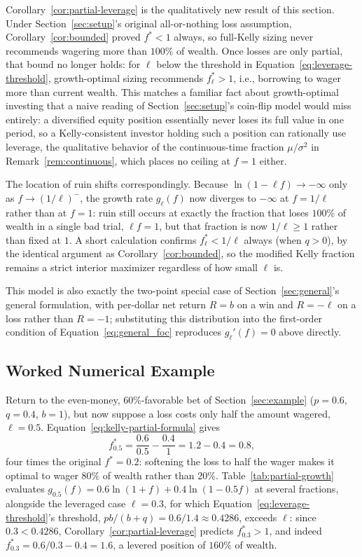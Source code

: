 \documentclass[11pt]{article}
\theoremstyle{remark}
\theoremstyle{definition}
\begin{document}
Corollary~\ref{cor:partial-leverage} is the qualitatively new result of this section. Under Section~\ref{sec:setup}'s original all-or-nothing loss assumption, Corollary~\ref{cor:bounded} proved $f^{*}<1$ always, so full-Kelly sizing never recommends wagering more than $100\%$ of wealth. Once losses are only partial, that bound no longer holds: for $\ell$ below the threshold in Equation~\eqref{eq:leverage-threshold}, growth-optimal sizing recommends $f_\ell^{*}>1$, i.e., borrowing to wager more than current wealth. This matches a familiar fact about growth-optimal investing that a naive reading of Section~\ref{sec:setup}'s coin-flip model would miss entirely: a diversified equity position essentially never loses its full value in one period, so a Kelly-consistent investor holding such a position can rationally use leverage, the qualitative behavior of the continuous-time fraction $\mu/\sigma^2$ in Remark~\ref{rem:continuous}, which places no ceiling at $f=1$ either.

The location of ruin shifts correspondingly. Because $\ln(1-\ell f)\to-\infty$ only as $f\to (1/\ell)^{-}$, the growth rate $g_\ell(f)$ now diverges to $-\infty$ at $f=1/\ell$ rather than at $f=1$: ruin still occurs at exactly the fraction that loses $100\%$ of wealth in a single bad trial, $\ell f=1$, but that fraction is now $1/\ell\ge 1$ rather than fixed at $1$. A short calculation confirms $f_\ell^{*}<1/\ell$ always (when $q>0$), by the identical argument as Corollary~\ref{cor:bounded}, so the modified Kelly fraction remains a strict interior maximizer regardless of how small $\ell$ is.

This model is also exactly the two-point special case of Section~\ref{sec:general}'s general formulation, with per-dollar net return $R=b$ on a win and $R=-\ell$ on a loss rather than $R=-1$; substituting this distribution into the first-order condition of Equation~\eqref{eq:general_foc} reproduces $g_\ell'(f)=0$ above directly.

\subsection{Worked Numerical Example}
\label{sec:partial-example}

Return to the even-money, $60\%$-favorable bet of Section~\ref{sec:example} ($p=0.6$, $q=0.4$, $b=1$), but now suppose a loss costs only half the amount wagered, $\ell=0.5$. Equation~\eqref{eq:kelly-partial-formula} gives
\begin{equation*}
f_{0.5}^{*} = \frac{0.6}{0.5} - \frac{0.4}{1} = 1.2 - 0.4 = 0.8,
\end{equation*}
four times the original $f^{*}=0.2$: softening the loss to half the wager makes it optimal to wager $80\%$ of wealth rather than $20\%$. Table~\ref{tab:partial-growth} evaluates $g_{0.5}(f) = 0.6\ln(1+f) + 0.4\ln(1-0.5f)$ at several fractions, alongside the leveraged case $\ell=0.3$, for which Equation~\eqref{eq:leverage-threshold}'s threshold, $pb/(b+q) = 0.6/1.4 \approx 0.4286$, exceeds $\ell$: since $0.3<0.4286$, Corollary~\ref{cor:partial-leverage} predicts $f_{0.3}^{*}>1$, and indeed $f_{0.3}^{*} = 0.6/0.3 - 0.4 = 1.6$, a levered position of $160\%$ of wealth.
\end{document}
